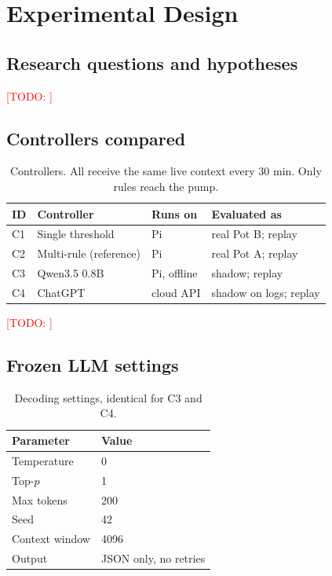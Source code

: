 \documentclass[10pt,twocolumn]{article}
\newcommand{\todo}[1]{\textcolor{red}{[TODO: #1]}}
\begin{document}
\section{Experimental Design}\label{sec:design}
\subsection{Research questions and hypotheses}
\todo{}

\subsection{Controllers compared}
\begin{table}[t]\centering\small
\caption{Controllers. All receive the same live context every 30 min. Only rules reach the pump.}
\label{tab:controllers}
\begin{tabular}{@{}llll@{}}\toprule
ID & Controller & Runs on & Evaluated as\\\midrule
C1 & Single threshold & Pi & real Pot B; replay\\
C2 & Multi-rule (reference) & Pi & real Pot A; replay\\
C3 & Qwen3.5 0.8B & Pi, offline & shadow; replay\\
C4 & ChatGPT & cloud API & shadow on logs; replay\\
\bottomrule\end{tabular}\end{table}
\todo{}

\subsection{Frozen LLM settings}
\begin{table}[t]\centering\small
\caption{Decoding settings, identical for C3 and C4.}
\label{tab:params}
\begin{tabular}{@{}ll@{}}\toprule
Parameter & Value\\\midrule
Temperature & 0\\ Top-$p$ & 1\\ Max tokens & 200\\ Seed & 42\\ Context window & 4096\\ Output & JSON only, no retries\\
\bottomrule\end{tabular}\end{table}
\end{document}
